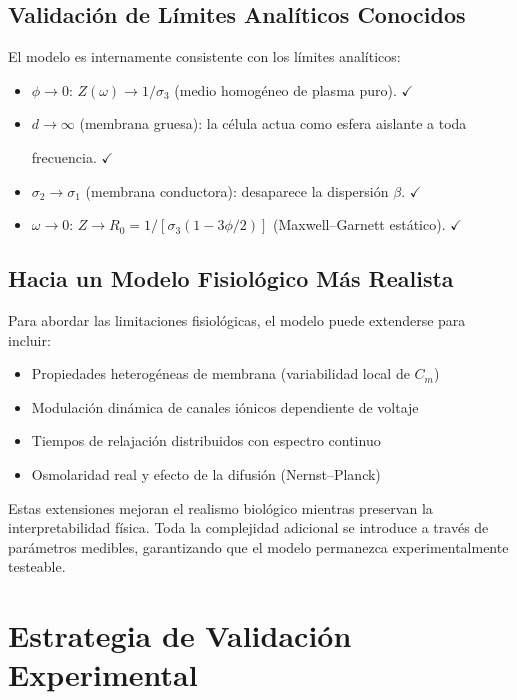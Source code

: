 \documentclass[12pt]{article}
\begin{document}
\subsection{Validaci\'on de L\'imites Anal\'iticos Conocidos}
El modelo es internamente consistente con los l\'imites anal\'iticos:

\begin{itemize}
\item $\phi \to 0$: $Z(\omega) \to 1/\sigma_3$ (medio homog\'eneo de plasma puro).
$\checkmark$
\item $d \to \infty$ (membrana gruesa): la c\'elula actua como esfera aislante a toda

frecuencia. $\checkmark$
\item $\sigma_2 \to \sigma_1$ (membrana conductora): desaparece la dispersi\'on $\beta$.
$\checkmark$
\item $\omega \to 0$: $Z \to R_0 = 1/[\sigma_3(1 - 3\phi/2)]$ (Maxwell--Garnett est\'atico).
$\checkmark$
\end{itemize}

\subsection{Hacia un Modelo Fisiol\'ogico M\'as Realista}

Para abordar las limitaciones fisiol\'ogicas, el modelo puede extenderse para incluir:

\begin{itemize}
\item Propiedades heterog\'eneas de membrana (variabilidad local de $C_m$)
\item Modulaci\'on din\'amica de canales i\'onicos dependiente de voltaje
\item Tiempos de relajaci\'on distribuidos con espectro continuo
\item Osmolaridad real y efecto de la difusi\'on (Nernst--Planck)
\end{itemize}

Estas extensiones mejoran el realismo biol\'ogico mientras preservan la interpretabilidad
f\'isica. Toda la complejidad adicional se introduce a trav\'es de par\'ametros medibles,
garantizando que el modelo permanezca experimentalmente testeable.


\section{Estrategia de Validaci\'on Experimental}
\end{document}
